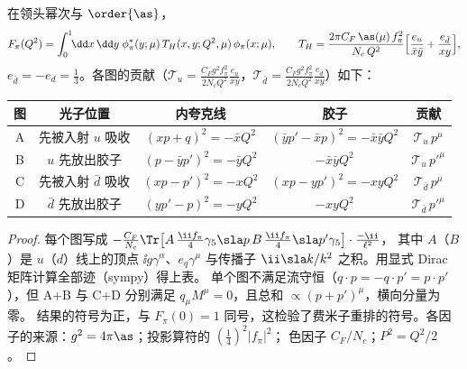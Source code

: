 \begin{proposition}[LO 硬散射核]\tagR\label{prop:cex-TH}
在领头幂次与 $\order{\as}$，
\begin{equation}\label{eq:cex-fpi-conv}
F_\pi(Q^2)=\int_0^1\!\!\dd x\,\dd y\;\phi_\pi^*(y;\mu)\,T_H(x,y;Q^2,\mu)\,\phi_\pi(x;\mu),\qquad
T_H=\frac{2\pi C_F\,\as(\mu)\,f_\pi^2}{N_c\,Q^2}\Big[\frac{e_u}{\bar x\bar y}+\frac{e_{\bar d}}{xy}\Big],
\end{equation}
$e_{\bar d}=-e_d=\frac13$。各图的贡献（$\mathcal T_u=\frac{C_Fg^2f_\pi^2}{2N_cQ^2}\frac{e_u}{\bar x\bar y}$，$\mathcal T_{\bar d}=\frac{C_Fg^2f_\pi^2}{2N_cQ^2}\frac{e_{\bar d}}{xy}$）如下：
\begin{center}
\begin{tabular}{@{}ccccc@{}}
\toprule
图 & 光子位置 & 内夸克线 & 胶子 & 贡献 \\
\midrule
A & 先被入射 $u$ 吸收 & $(xp+q)^2=-\bar xQ^2$ & $(\bar yp'-\bar xp)^2=-\bar x\bar yQ^2$ & $\mathcal T_u\,p^\mu$\\
B & $u$ 先放出胶子 & $(p-\bar yp')^2=-\bar yQ^2$ & $-\bar x\bar yQ^2$ & $\mathcal T_u\,p'^\mu$\\
C & 先被入射 $\bar d$ 吸收 & $(xp-p')^2=-xQ^2$ & $(xp-yp')^2=-xyQ^2$ & $\mathcal T_{\bar d}\,p^\mu$\\
D & $\bar d$ 先放出胶子 & $(yp'-p)^2=-yQ^2$ & $-xyQ^2$ & $\mathcal T_{\bar d}\,p'^\mu$\\
\bottomrule
\end{tabular}
\end{center}
\end{proposition}

\begin{proof}
每个图写成 $-\frac{C_F}{N_c}\Tr\big[A\,\tfrac{\ii f_\pi}4\gamma_5\sla p\,B\,\tfrac{\ii f_\pi}4\sla p'\gamma_5\big]\cdot\frac{-\ii}{\ell^2}$，
其中 $A$（$B$）是 $u$（$d$）线上的顶点 $\ii g\gamma^\alpha$、$e_q\gamma^\mu$ 与传播子 $\ii\sla k/k^2$ 之积。用显式 Dirac 矩阵计算全部迹（sympy）得上表。
单个图不满足流守恒（$q\cdot p=-q\cdot p'=p\cdot p'$），但 A+B 与 C+D 分别满足 $q_\mu M^\mu=0$，且总和 $\propto(p+p')^\mu$，横向分量为零。
结果的符号为正，与 $F_\pi(0)=1$ 同号，这检验了费米子重排的符号。各因子的来源：$g^2=4\pi\as$；投影算符的 $(\frac14)^2|f_\pi|^2$；
色因子 $C_F/N_c$；$P^2=Q^2/2$。
\end{proof}

